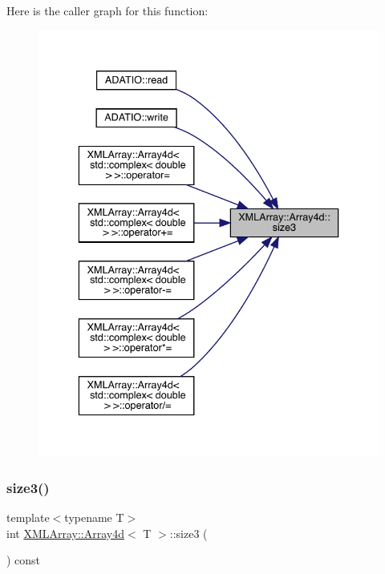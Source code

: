 Here is the caller graph for this function\+:\nopagebreak
\begin{figure}[H]
\begin{center}
\leavevmode
\includegraphics[width=336pt]{de/d16/classXMLArray_1_1Array4d_ae9c6211389f5a1fd2bc756bb5e7b53b1_icgraph}
\end{center}
\end{figure}
\mbox{\label{classXMLArray_1_1Array4d_ae9c6211389f5a1fd2bc756bb5e7b53b1}} 
\subsubsection{\texorpdfstring{size3()}{size3()}\hspace{0.1cm}{\footnotesize\ttfamily [2/2]}}
{\footnotesize\ttfamily template$<$typename T$>$ \\
int \mbox{\hyperlink{classXMLArray_1_1Array4d}{X\+M\+L\+Array\+::\+Array4d}}$<$ T $>$\+::size3 (\begin{DoxyParamCaption}{ }\end{DoxyParamCaption}) const\hspace{0.3cm}{\ttfamily [inline]}}

